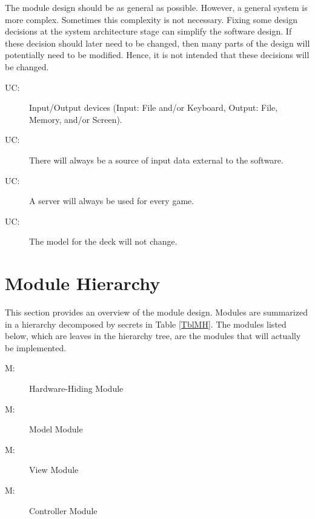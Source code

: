 \documentclass[12pt, titlepage]{article}
\newcounter{ucnum}
\newcommand{\uctheucnum}{UC\theucnum}
\newcounter{mnum}
\newcommand{\mthemnum}{M\themnum}
\begin{document}
The module design should be as general as possible. However, a general system is
more complex. Sometimes this complexity is not necessary. Fixing some design
decisions at the system architecture stage can simplify the software design. If
these decision should later need to be changed, then many parts of the design
will potentially need to be modified. Hence, it is not intended that these
decisions will be changed.

\begin{description}
\item[ \uctheucnum \label{ucIO}:] Input/Output devices (Input: File and/or Keyboard, Output: File, Memory, and/or Screen).
\item[ \uctheucnum \label{ucInput}:] There will always be a source of input data external to the software.
\item[ \uctheucnum:] A server will always be used for every game.
\item[ \uctheucnum:] The model for the deck will not change.
\end{description}

\section{Module Hierarchy} \label{SecMH}

This section provides an overview of the module design. Modules are summarized
in a hierarchy decomposed by secrets in Table \ref{TblMH}. The modules listed
below, which are leaves in the hierarchy tree, are the modules that will
actually be implemented.

\begin{description}
\item [ \mthemnum \label{mHH}:] Hardware-Hiding Module
\item [ \mthemnum \label{mModel}:] Model Module
\item [ \mthemnum \label{mView}:] View Module
\item [ \mthemnum \label{mController}:] Controller Module
\end{description}
\end{document}

